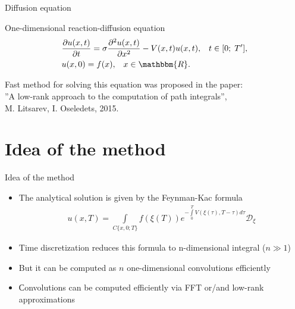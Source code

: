 \documentclass{beamer}
\theoremstyle{definition}
\theoremstyle{plain}
\theoremstyle{remark}
\begin{document}
		\begin{frame}{Diffusion equation}

			\begin{block}{One-dimensional reaction-diffusion equation}
				\begin{equation}
					\begin{aligned}
						&\frac{\partial u(x,t)}{\partial t} = \sigma \frac{\partial^2 u(x,t)}{\partial x^2} - V(x,t) u(x,t),
						\;\;\; t \in [0;\;T^{\prime}],\\
						&u(x,0) = f(x), \;\;\; x \in \mathbbm{R}.
					\nonumber
					\end{aligned}
				\end{equation}
			\end{block}

			\begin{center}
				Fast method for solving this equation was proposed in the paper:\\
				''A low-rank approach to the computation of path integrals'',\\ M. Litsarev, I. Oseledets, 2015.
			\end{center}
		\end{frame}

	\section{Idea of the method}
		\begin{frame}{Idea of the method}
            \begin{itemize}
                \item The analytical solution is given by the Feynman-Kac formula
                \begin{equation}
                    \begin{aligned}
                    \nonumber
                    u(x, T) = \int\limits_{C\{x,0; T\}} f(\xi(T)) e^{-\int\limits_0^T V(\xi(\tau), T - \tau) d\tau} \mathcal D_\xi
                    \end{aligned}
                \end{equation} 
                \item Time discretization reduces this formula to n-dimensional integral ($n \gg 1$)
                \item But it can be computed as $n$ one-dimensional convolutions efficiently  
                \item Сonvolutions can be computed efficiently via FFT or/and low-rank approximations
            \end{itemize}		
		\end{frame}
		
\end{document}
